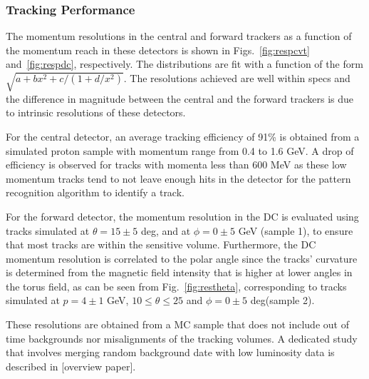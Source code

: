 \subsubsection{Tracking Performance}

The momentum resolutions in the central and forward trackers as a function of the momentum reach
in these detectors is shown in Figs.~\ref{fig:respcvt} and~\ref{fig:respdc}, respectively.  The distributions are fit with a function of the form $\sqrt{a+b x^{2}+c/(1+d/x^{2})}$.  The resolutions achieved are well within specs and the difference in magnitude between the central and the forward trackers is due to intrinsic resolutions of these detectors. 

For the central detector, an average tracking efficiency of 91\% is obtained from a simulated proton sample with momentum range from 0.4 to 1.6 GeV.  A drop of efficiency is observed for tracks with momenta less than 600 MeV as these low momentum tracks tend to not leave enough hits in the detector for the pattern recognition algorithm to identify a track.  

For the forward detector, the momentum resolution in the DC is evaluated using  tracks simulated at $\theta =15\pm 5$ deg, and at $\phi = 0 \pm 5$ GeV (sample 1), to ensure that most tracks are within the sensitive volume.
Furthermore, the DC momentum resolution is correlated to the polar angle since the tracks' curvature is determined from the magnetic field intensity that is higher at lower angles in the torus field, as can be seen from Fig.~\ref{fig:restheta}, corresponding to tracks simulated at $p=4\pm 1$ GeV, $10\leq \theta\leq 25$ and $\phi = 0 \pm 5$ deg(sample 2).

These resolutions are obtained from a MC sample that does not include out of time backgrounds nor misalignments of the tracking volumes.   
A dedicated study that involves merging random background date with low luminosity data is described in [overview paper].

